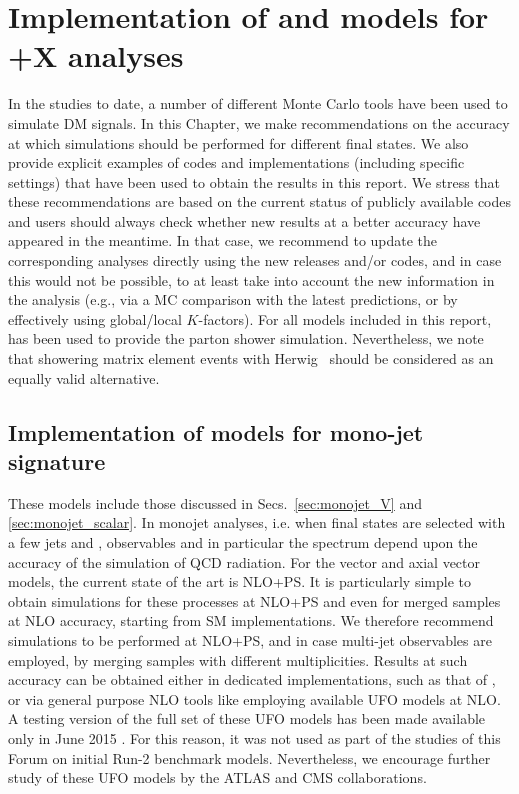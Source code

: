 \section{\texorpdfstring{Implementation of \schannel and \tchannel models for \MET+X analyses}{Implementation of \schannel and \tchannel models for MET+X analyses}}

In the studies to date, a number of different Monte Carlo tools have
been used to simulate DM signals.  In this Chapter, we make recommendations 
on the accuracy at which simulations should be performed for different final states. We 
also provide explicit examples  of codes and implementations (including specific settings) 
that have been used to obtain the results in this report.
We stress that these recommendations are based on the current
status of publicly available codes and users should always check whether new results
at a better accuracy have appeared in the meantime. In that case, we recommend to update
the corresponding analyses  directly using the new releases and/or codes, and in case this would not be possible,
to at least take into account the new information in the analysis (e.g., via a MC comparison with the latest predictions, 
or by effectively using global/local $K$-factors). For all models included in this report, 
\pythiaEight has been used to provide the parton shower simulation. Nevertheless, 
we note that showering matrix element events with Herwig~\cite{Bahr:2008pv,Corcella:2002jc,Corcella:2000bw,Marchesini1992465} should be considered as 
an equally valid alternative.

\subsection{Implementation of  \schannel  models for mono-jet signature}
\label{sec:monojet_implementation}

These models include those discussed in Secs.~\ref{sec:monojet_V} and \ref{sec:monojet_scalar}.
In monojet analyses, i.e. when final states are selected with a few jets and \MET{}, observables and in particular the \MET{} spectrum depend upon the accuracy of the simulation of QCD radiation.
For the vector and axial vector models, the current state of the art is  NLO+PS. It is particularly simple to obtain simulations for these processes at NLO+PS and even for merged samples at NLO accuracy, starting from SM implementations.  We therefore recommend simulations to be performed at NLO+PS, and in case multi-jet observables are employed,  by merging samples with different multiplicities. 
Results at such accuracy can be obtained either in dedicated implementations, such as that of  \powheg \cite{Haisch:2013ata}, or via general purpose NLO tools like \madgraph employing available UFO models at NLO. A testing version of the full set of these UFO models has been made available
only in June 2015 \cite{NewMadgraphModels}. For this reason, it was not used as part of the studies of this Forum on initial Run-2 benchmark models. Nevertheless, we encourage further study of these UFO models by the ATLAS and CMS collaborations.

